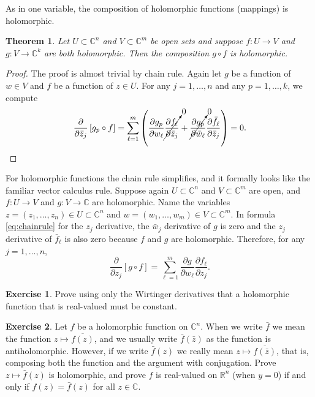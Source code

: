 \documentclass[12pt,openany]{book}
\newcommand{\C}{{\mathbb{C}}}
\newcommand{\R}{{\mathbb{R}}}
\theoremstyle{plain}
\newtheorem{thm}{Theorem}[section]
\theoremstyle{remark}
\theoremstyle{definition}
\newenvironment{exbox}{%
    \def\FrameCommand{\vrule width 1pt \relax\hspace{10pt}}%
    \MakeFramed{\advance\hsize-\width\FrameRestore}%
}{%
    \endMakeFramed
}
\theoremstyle{exercise}
\newtheorem{exercise}{Exercise}[section]
\theoremstyle{example}
\begin{document}
As in one variable, the composition of holomorphic functions (mappings) is
holomorphic.

\begin{thm}
Let $U \subset \C^n$ and $V \subset \C^m$ be open sets and suppose
$f \colon U \to V$ and $g \colon V \to \C^k$ are both holomorphic.
%
Then the composition $g \circ f$ is holomorphic.
\end{thm}

\begin{proof}
The proof is almost trivial by chain rule.
Again let $g$ be a function of $w \in V$ and $f$ be a function of $z \in U$.
For any $j = 1,\ldots,n$ and any $p=1,\ldots,k$, we compute
\begin{equation*}
\frac{\partial}{\partial \bar{z}_j} \left[ g_p \circ f \right]
=
\sum_{\ell=1}^m 
\left(
\frac{\partial g_p}{\partial w_\ell} 
\cancelto{0}{\frac{\partial f_\ell}{\partial \bar{z}_j}}
+
\cancelto{0}{\frac{\partial g_p}{\partial \bar{w}_\ell}}
\frac{\partial \bar{f}_\ell}{\partial \bar{z}_j} 
\right)
=
0 . \qedhere
\end{equation*}
\end{proof}

For holomorphic functions the chain rule simplifies, and it formally looks
like the familiar vector calculus rule.
Suppose again
$U \subset \C^n$ and $V \subset \C^m$ are open, and 
$f \colon U \to V$ and $g \colon V \to \C$ are holomorphic.
Name the variables
$z = (z_1,\ldots,z_n) \in U \subset \C^n$ and $w = (w_1,\ldots,w_m) \in V
\subset \C^m$.  In formula \eqref{eq:chainrule} for the $z_j$ derivative,
the $\bar{w}_j$ derivative of $g$ is zero and the $z_j$ derivative of
$\bar{f}_\ell$ is also zero because $f$ and $g$ are holomorphic.
Therefore, for any $j=1,\ldots,n$,
\begin{equation*}
\frac{\partial}{\partial z_j} \left[ g \circ f \right]
=
\sum_{\ell=1}^m 
\frac{\partial g}{\partial w_\ell}
\frac{\partial f_\ell}{\partial z_j} .
\end{equation*}

\begin{exbox}
\begin{exercise}
Prove using only the Wirtinger derivatives that a holomorphic function
that is real-valued must be constant.
\end{exercise}

\begin{exercise}
Let $f$ be a holomorphic function on $\C^n$.
When we write $\bar{f}$ we mean the function $z \mapsto \overline{f(z)}$,
and we usually write $\bar{f}(\bar{z})$ as the function is antiholomorphic.
However,
if we write $\bar{f}(z)$ we really mean $z \mapsto \overline{f(\bar{z})}$,
that is, composing both the function and the argument with conjugation.
Prove $z \mapsto \bar{f}(z)$ is holomorphic, and prove $f$ is
real-valued on $\R^n$ (when $y=0$) if and only if $f(z) =
\bar{f}(z)$ for all $z \in \C$.
\end{exercise}
\end{exbox}
\end{document}
